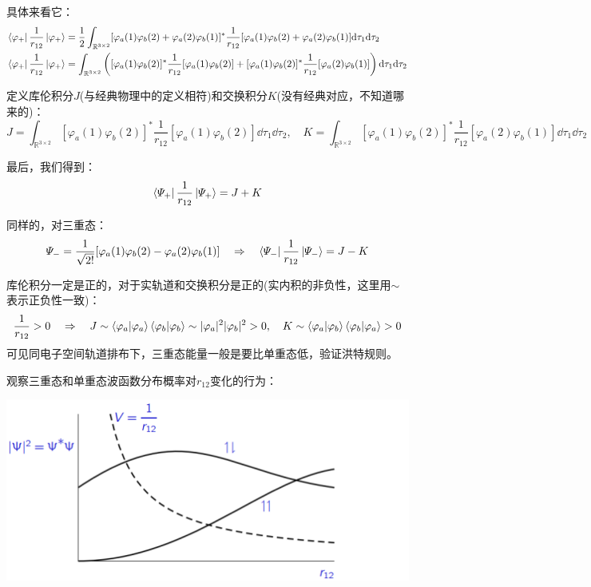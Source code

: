 具体来看它：
\[\begin{aligned}
\bra{\varphi_{+}}\frac{1}{r_{12}}\ket{\varphi_{+}}&=\frac{1}{2}\int_{\mathbb{R}^{3 \times 2}}[\varphi_a(1)\varphi_b(2)+\varphi_a(2)\varphi_b(1)]^{*}\frac{1}{r_{12}}[\varphi_a(1)\varphi_b(2)+\varphi_a(2)\varphi_b(1)]\dd\tau_1\dd\tau_2 \\ \bra{\varphi_{+}}\frac{1}{r_{12}}\ket{\varphi_{+}}&=\int_{\mathbb{R}^{3 \times 2}} \left( [\varphi_a(1)\varphi_b(2)]^{*}\frac{1}{r_{12}}[\varphi_a(1)\varphi_b(2)]+[\varphi_a(1)\varphi_b(2)]^{*}\frac{1}{r_{12}}[\varphi_a(2)\varphi_b(1)] \right)\dd\tau_1\dd\tau_2
\end{aligned}\]

定义库伦积分$J$(与经典物理中的定义相符)和交换积分$K$(没有经典对应，不知道哪来的)：
\[J=\int_{\mathbb{R}^{3 \times 2}}[\varphi_a(1)\varphi_b(2)]^{*}\frac{1}{r_{12}}[\varphi_a(1)\varphi_b(2)]\dd\tau_1\dd\tau_2, \quad K=\int_{\mathbb{R}^{3 \times 2}}[\varphi_a(1)\varphi_b(2)]^{*}\frac{1}{r_{12}}[\varphi_a(2)\varphi_b(1)]\dd\tau_1\dd\tau_2\]

最后，我们得到：
\[\bra{\varPsi_{+}}\frac{1}{r_{12}}\ket{\varPsi_{+}}=J+K\]

同样的，对三重态：
\[\varPsi_{-}=\frac{1}{\sqrt{2!}}[\varphi_a(1)\varphi_b(2)-\varphi_a(2)\varphi_b(1)] \quad \Rightarrow \quad \bra{\varPsi_{-}}\frac{1}{r_{12}}\ket{\varPsi_{-}}=J-K\]

库伦积分一定是正的，对于实轨道和交换积分是正的(实内积的非负性，这里用$\sim$表示正负性一致)：
\[\frac{1}{r_{12}}>0 \quad \Rightarrow \quad J\sim\bra{\varphi_a}\ket{\varphi_a}\bra{\varphi_b}\ket{\varphi_b}\sim|\varphi_a|^2|\varphi_b|^2>0, \quad K\sim\bra{\varphi_a}\ket{\varphi_b}\bra{\varphi_b}\ket{\varphi_a}>0\]
可见同电子空间轨道排布下，三重态能量一般是要比单重态低，验证洪特规则。

观察三重态和单重态波函数分布概率对$r_{12}$变化的行为：
\begin{center}
    \includegraphics[scale=0.7]{fig/lzhx/微信图片_20211030111438.png}
\end{center}


